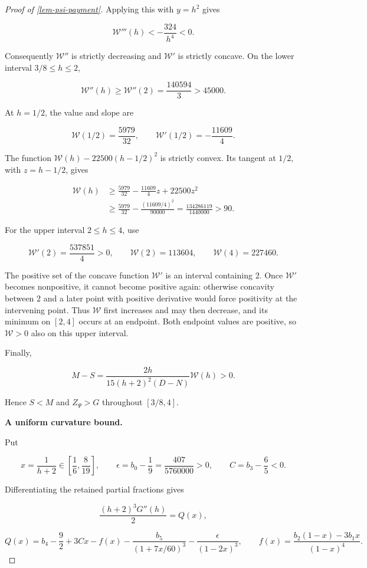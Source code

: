 \documentclass[11pt,a4paper]{article}
\theoremstyle{proofmanuscript}
\begin{document}
\begin{proof}[Proof of \ref{lem-psi-payment}]
Applying this with \(y=h^2\) gives

\[
\mathcal W'''(h)<-\frac{324}{h^4}<0.
\]

Consequently \(\mathcal W''\) is strictly decreasing and \(\mathcal W'\) is strictly concave. On the lower interval \(3/8\le h\le2\),

\[
\mathcal W''(h)\ge\mathcal W''(2)=\frac{140594}{3}>45000.
\]

At \(h=1/2\), the value and slope are

\[
\mathcal W(1/2)=\frac{5979}{32},\qquad
\mathcal W'(1/2)=-\frac{11609}{4}.
\]

The function \(\mathcal W(h)-22500(h-1/2)^2\) is strictly convex. Its tangent at \(1/2\), with \(z=h-1/2\), gives

\[
\begin{aligned}
\mathcal W(h)
&\ge\frac{5979}{32}-\frac{11609}{4}z+22500z^2\\
&\ge\frac{5979}{32}-\frac{(11609/4)^2}{90000}
=\frac{134286119}{1440000}>90.
\end{aligned}
\]

For the upper interval \(2\le h\le4\), use

\[
\mathcal W'(2)=\frac{537851}{4}>0,\qquad
\mathcal W(2)=113604,\qquad \mathcal W(4)=227460.
\]

The positive set of the concave function \(\mathcal W'\) is an interval containing \(2\). Once \(\mathcal W'\) becomes nonpositive, it cannot become positive again: otherwise concavity between \(2\) and a later point with positive derivative would force positivity at the intervening point. Thus \(\mathcal W\) first increases and may then decrease, and its minimum on \([2,4]\) occurs at an endpoint. Both endpoint values are positive, so \(\mathcal W>0\) also on this upper interval.

Finally,

\[
M-S=\frac{2h}{15(h+2)^2(D-N)}\mathcal W(h)>0.
\]

Hence \(S<M\) and \(Z_\Psi>G\) throughout \([3/8,4]\).

\textbf{A uniform curvature bound.}

Put

\[
x=\frac1{h+2}\in\left[\frac16,\frac8{19}\right],\qquad
\epsilon=b_0-\frac19=\frac{407}{5760000}>0,\qquad C=b_3-\frac65<0.
\]

Differentiating the retained partial fractions gives

\[
\frac{(h+2)^3G''(h)}2=Q(x),
\]

\[
Q(x)=b_4-\frac92+3Cx-f(x)
-\frac{b_5}{(1+7x/60)^3}-\frac{\epsilon}{(1-2x)^3},
\qquad
f(x)=\frac{b_2(1-x)-3b_1x}{(1-x)^4}.
\]


\end{proof}
\end{document}

